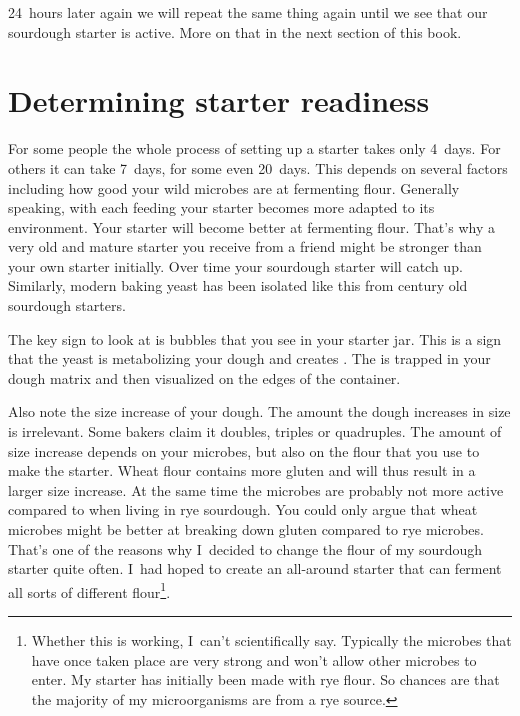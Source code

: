 24~hours later again we will repeat the same thing again until
we see that our sourdough starter is active. More on that in the
next section of this book.

\section{Determining starter readiness}

For some people the whole process of setting up a starter takes
only 4~days. For others it can take 7~days, for some even 20~days.
This depends on several factors including how good your wild microbes
are at fermenting flour. Generally speaking, with each feeding
your starter becomes more adapted to its environment. Your
starter will become better at fermenting flour. That's why
a very old and mature starter you receive from a friend might
be stronger than your own starter initially. Over time
your sourdough starter will catch up. Similarly, modern baking
yeast has been isolated like this from century old sourdough
starters.

\begin{flowchart}[!htb]
\centering
  
  \caption[Determining sourdough starter readiness]{A flow chart showing you how to
      determine if your sourdough starter is ready to be used. Make sure to
      wait at least \qtyrange{6}{12}{\hour} after feeding your
      starter to check its readiness. To evaluate it, look at your starter's size
      increase, airy texture and take note of its smell.
      All three factors are important to properly evaluate your starter's activity level.
      An active starter is an important foundation for a successful dough fermentation}%
  \label{fig:sourdough-starter-readiness}
\end{flowchart}

The key sign to look at is bubbles that you see in your starter
jar. This is a sign that the yeast is metabolizing your
dough and creates . The  is trapped in your dough
matrix and then visualized on the edges of the container.

Also note the size increase of your dough. The amount the dough increases
in size is irrelevant. Some bakers claim it doubles, triples or quadruples.
The amount of size increase depends on your microbes, but also on
the flour that you use to make the starter. Wheat flour contains
more gluten and will thus result in a larger size increase. At
the same time the microbes are probably not more active compared
to when living in rye sourdough. You could only argue that
wheat microbes might be better at breaking down gluten compared
to rye microbes. That's one of the reasons why I~decided to change
the flour of my sourdough starter quite often. I~had hoped to create
an all-around starter that can ferment all sorts of different
flour\footnote{Whether this is working, I~can't scientifically say.
Typically the microbes that have once taken place are very strong
and won't allow other microbes to enter. My starter has initially
been made with rye flour. So chances are that the majority of
my microorganisms are from a rye source.}.

